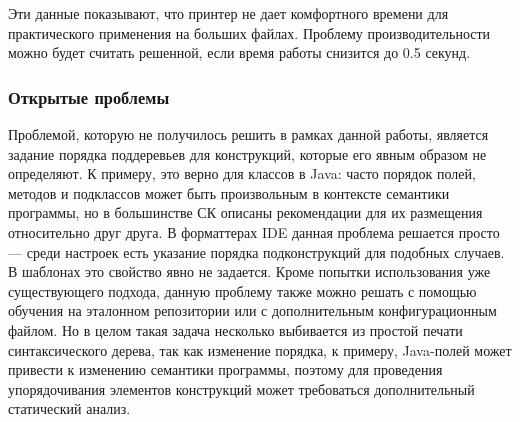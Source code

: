 Эти данные показывают, что принтер не дает комфортного времени
для практического применения на больших файлах. Проблему производительности
можно будет считать решенной, если время работы снизится до 0.5 секунд.

\newpage
\subsubsection{Открытые проблемы}

Проблемой, которую не получилось решить в рамках данной работы,
является задание порядка поддеревьев для конструкций, которые
его явным образом не определяют. К примеру, это верно для классов в Java:
часто порядок полей, методов и подклассов может быть произвольным в контексте
семантики программы, но в большинстве СК описаны рекомендации для их размещения
относительно друг друга. В форматтерах IDE данная проблема решается просто ---
среди настроек есть указание порядка подконструкций для подобных случаев.
В шаблонах это свойство явно не задается. Кроме попытки использования
уже существующего подхода, данную проблему также можно 
решать с помощью обучения на эталонном репозитории или с дополнительным
конфигурационным файлом. Но в целом такая задача несколько выбивается из
простой печати синтаксического дерева, так как изменение порядка, к примеру,
Java-полей может привести к изменению семантики программы, поэтому для проведения
упорядочивания элементов конструкций может требоваться дополнительный статический
анализ.
